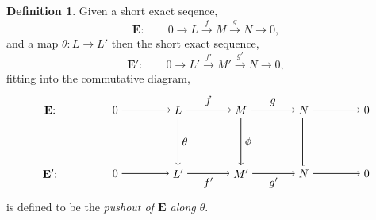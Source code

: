 \documentclass[11.5pt, twoside, a4paper, titlepage]{report}
\theoremstyle{definition}
\newtheorem{mydef}{Definition}[section]
\theoremstyle{plain}
\begin{document}
\begin{mydef} \label{pushoutdef}
Given a short exact seqence,
\begin{equation*}
\mathbf{E}: \qquad 0\xrightarrow{}L\xrightarrow{f} M \xrightarrow{g} N \xrightarrow{} 0,
\end{equation*}
and a map $\theta : L \to L'$ then the short exact sequence, 
\begin{equation*}
\mathbf{E'}: \qquad 0\xrightarrow{} L' \xrightarrow{f'} M' \xrightarrow{g'} N \xrightarrow{}0,
\end{equation*}
fitting into the commutative diagram,
\begin{equation*}
\begin{tikzpicture}[->,-latex, auto, main path/.style={->, semithick}, main node/.style={}]
\node	[main node]		(1) at (0,0)		{$\mathbf{E}$: \quad };
\node	[main node]		(2) at (2,0)		{$0$};
\node	[main node]		(3) at (4,0)		{$L$};
\node [main node]		(4) at (6,0)		{$M$};
\node [main node]		(5) at (8,0)		{$N$};
\node	[main node]		(11) at (10,0)	{$0$};

\node	[main node]		(6) at (0,-2)		{$\mathbf{E'}$: \quad};
\node	[main node]		(7) at (2,-2)		{$0$};
\node	[main node]		(8) at (4,-2)		{$L'$};
\node [main node]		(9) at (6,-2)		{$M'$};
\node [main node]		(10) at (8,-2)	{$N$};
\node [main node]		(13) at (10,-2)	{$0$};

\draw (2) edge [main path] node [auto] {$$} (3);
\draw (3) edge [main path] node [auto] {$f$} (4);
\draw (4) edge [main path] node [auto] {$g$} (5);
\draw (5) edge [main path] (11);

\draw (7) edge [main path] node [auto] {$$} (8);
\draw (8) edge [main path] node [auto, swap] {$f'$} (9);
\draw (9) edge [main path] node [auto, swap] {$g'$} (10);
\draw (10) edge [main path] (13);

\draw (3) edge [main path] node [auto] {$\theta$} (8);
\draw (4) edge [main path] node [auto] {$\phi$} (9);
\draw (5) edge [-, semithick, double, double distance=1.5pt](10);
\end{tikzpicture}
\end{equation*}
is defined to be the \emph{pushout of $\mathbf{E}$ along $\theta$}.
\end{mydef}
\end{document}
